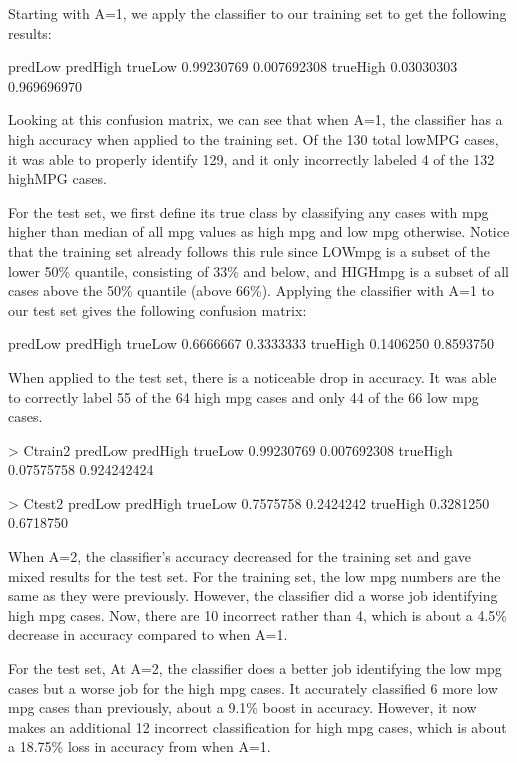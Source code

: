 \documentclass{homework}
\begin{document}
Starting with A=1, we apply the classifier to our training set to get the following results:
\begin{rc}
         predLow     predHigh
trueLow  0.99230769 0.007692308
trueHigh 0.03030303 0.969696970
\end{rc}
Looking at this confusion matrix, we can see that when A=1, the classifier has a high accuracy when applied to the training set. Of the 130 total lowMPG cases, it was able to properly identify 129, and it only incorrectly labeled 4 of the 132 highMPG cases. 

For the test set, we first define its true class by classifying any cases with mpg higher than median of all mpg values as high mpg and low mpg otherwise. Notice that the training set already follows this rule since LOWmpg is a subset of the lower 50\% quantile, consisting of 33\% and below, and HIGHmpg is a subset of all cases above the 50\% quantile (above 66\%). Applying the classifier with A=1 to our test set gives the following confusion matrix:

\begin{rc}
         predLow    predHigh
trueLow  0.6666667 0.3333333
trueHigh 0.1406250 0.8593750
\end{rc}

When applied to the test set, there is a noticeable drop in accuracy. It was able to correctly label 55 of the 64 high mpg cases and only 44 of the 66 low mpg cases. 

\begin{rc}
> Ctrain2
           predLow   predHigh
trueLow  0.99230769 0.007692308
trueHigh 0.07575758 0.924242424

> Ctest2
           predLow  predHigh
trueLow  0.7575758 0.2424242
trueHigh 0.3281250 0.6718750
\end{rc}

When A=2, the classifier's accuracy decreased for the training set and gave mixed results for the test set. For the training set, the low mpg numbers are the same as they were previously. However, the classifier did a worse job identifying high mpg cases. Now, there are 10 incorrect rather than 4, which is about a 4.5\% decrease in accuracy compared to when A=1. 

For the test set, At A=2, the classifier does a better job identifying the low mpg cases but a worse job for the high mpg cases. It accurately classified 6 more low mpg cases than previously, about a 9.1\% boost in accuracy. However, it now makes an additional 12 incorrect classification for high mpg cases, which is about a 18.75\% loss in accuracy from when A=1.
\end{document}
